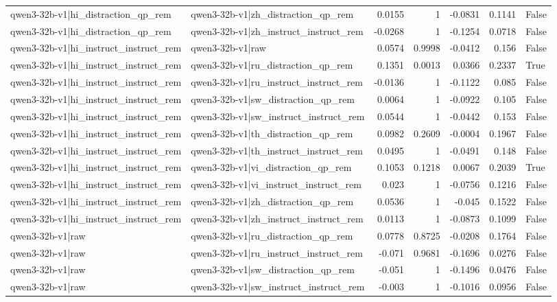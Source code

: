 \begin{table}
\begin{tabular}{l l r r r r l}
qwen3-32b-v1|hi_distraction_qp_rem & qwen3-32b-v1|zh_distraction_qp_rem & 0.0155 & 1 & -0.0831 & 0.1141 & False \\
qwen3-32b-v1|hi_distraction_qp_rem & qwen3-32b-v1|zh_instruct_instruct_rem & -0.0268 & 1 & -0.1254 & 0.0718 & False \\
qwen3-32b-v1|hi_instruct_instruct_rem & qwen3-32b-v1|raw & 0.0574 & 0.9998 & -0.0412 & 0.156 & False \\
qwen3-32b-v1|hi_instruct_instruct_rem & qwen3-32b-v1|ru_distraction_qp_rem & 0.1351 & 0.0013 & 0.0366 & 0.2337 & True \\
qwen3-32b-v1|hi_instruct_instruct_rem & qwen3-32b-v1|ru_instruct_instruct_rem & -0.0136 & 1 & -0.1122 & 0.085 & False \\
qwen3-32b-v1|hi_instruct_instruct_rem & qwen3-32b-v1|sw_distraction_qp_rem & 0.0064 & 1 & -0.0922 & 0.105 & False \\
qwen3-32b-v1|hi_instruct_instruct_rem & qwen3-32b-v1|sw_instruct_instruct_rem & 0.0544 & 1 & -0.0442 & 0.153 & False \\
qwen3-32b-v1|hi_instruct_instruct_rem & qwen3-32b-v1|th_distraction_qp_rem & 0.0982 & 0.2609 & -0.0004 & 0.1967 & False \\
qwen3-32b-v1|hi_instruct_instruct_rem & qwen3-32b-v1|th_instruct_instruct_rem & 0.0495 & 1 & -0.0491 & 0.148 & False \\
qwen3-32b-v1|hi_instruct_instruct_rem & qwen3-32b-v1|vi_distraction_qp_rem & 0.1053 & 0.1218 & 0.0067 & 0.2039 & True \\
qwen3-32b-v1|hi_instruct_instruct_rem & qwen3-32b-v1|vi_instruct_instruct_rem & 0.023 & 1 & -0.0756 & 0.1216 & False \\
qwen3-32b-v1|hi_instruct_instruct_rem & qwen3-32b-v1|zh_distraction_qp_rem & 0.0536 & 1 & -0.045 & 0.1522 & False \\
qwen3-32b-v1|hi_instruct_instruct_rem & qwen3-32b-v1|zh_instruct_instruct_rem & 0.0113 & 1 & -0.0873 & 0.1099 & False \\
qwen3-32b-v1|raw & qwen3-32b-v1|ru_distraction_qp_rem & 0.0778 & 0.8725 & -0.0208 & 0.1764 & False \\
qwen3-32b-v1|raw & qwen3-32b-v1|ru_instruct_instruct_rem & -0.071 & 0.9681 & -0.1696 & 0.0276 & False \\
qwen3-32b-v1|raw & qwen3-32b-v1|sw_distraction_qp_rem & -0.051 & 1 & -0.1496 & 0.0476 & False \\
qwen3-32b-v1|raw & qwen3-32b-v1|sw_instruct_instruct_rem & -0.003 & 1 & -0.1016 & 0.0956 & False \\

\end{tabular}
\end{table}
